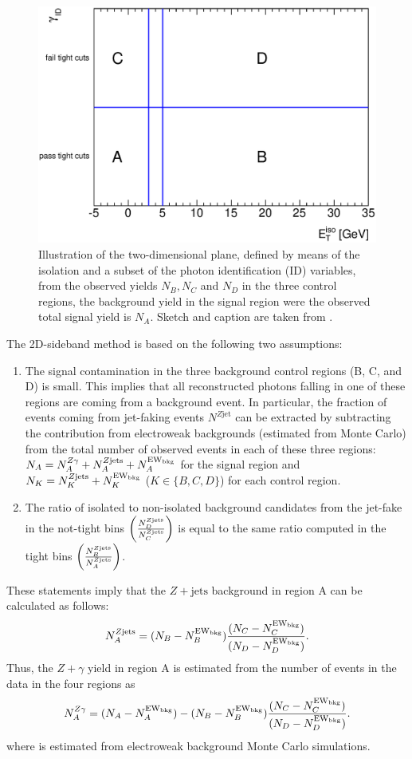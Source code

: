 \begin{figure}[!hbpt]
  \centering
  \includegraphics[scale=0.60]{figures/2dsketch.eps}
  \caption{{\small Illustration of the two-dimensional plane, defined	
      by means of the isolation and a subset of the photon
      identification (ID) variables, from the observed yields $N_{B},
      N_{C}$ and $N_{D}$ in the three control regions, the background
    yield in the signal region were the observed total signal yield is
    $N_{A}$. Sketch and caption are taken from \cite{}.}}
\label{fig::2dsketch}
\end{figure}

The 2D-sideband method is based on the following two assumptions: 
\begin{enumerate}
\item The signal contamination in the three background control regions (B, C, and D)
is small. This implies that all reconstructed photons falling in
one of these regions are coming from a background event. In particular, the
fraction of events coming from jet-faking events $N^{Z\text{jet}}$ can be
extracted by subtracting the contribution from electroweak backgrounds 
\New{} (estimated from Monte Carlo) from the total number of
observed events in each of these three regions: $N_A = N_{A}^{Z\gamma} + N_{A}^{Z\text{jets}} + N_{A}^{\text{EW$_{\text{bkg}}$}}$
for the signal region and $N_K = N_{K}^{Z\text{jets}} + N_{K}^{\text{EW$_{\text{bkg}}$}}$ ($K \in \{B, C, D\}$) 
for each control region.
%
\item The ratio of isolated to non-isolated background candidates from the jet-fake
in the not-tight bins $\left(\frac{N_{D}^{Z\text{jets}}}{N_{C}^{Z\text{jets}}}\right)$
is equal to the same ratio computed in the tight bins
$\left(\frac{N_{B}^{Z\text{jets}}}{N_{A}^{Z\text{jets}}}\right)$.
\end{enumerate}
These statements imply that the $Z+\text{jets}$ background in region A can
be calculated as follows:
\begin{equation}
    N_{A}^{Z\text{jets}} = (N_B - N_{B}^{\text{EW$_{\text{bkg}}$}})\frac{(N_C - N_{C}^{\text{EW$_{\text{bkg}}$}})}{(N_D - N_{D}^{\text{EW$_{\text{bkg}}$}})}.
\end{equation}
Thus, the $Z+\gamma$ yield  in region A is estimated from the number
of events in the data in the four regions as
\begin{equation}
   N_{A}^{Z\gamma} = (N_A - N_{A}^{\text{EW$_{\text{bkg}}$}}) - (N_B - N_{B}^{\text{EW$_{\text{bkg}}$}})\frac{(N_C - N_{C}^{\text{EW$_{\text{bkg}}$}})}{(N_D - N_{D}^{\text{EW$_{\text{bkg}}$}})}.
\end{equation}
where \New{} is estimated from electroweak background Monte Carlo simulations.

